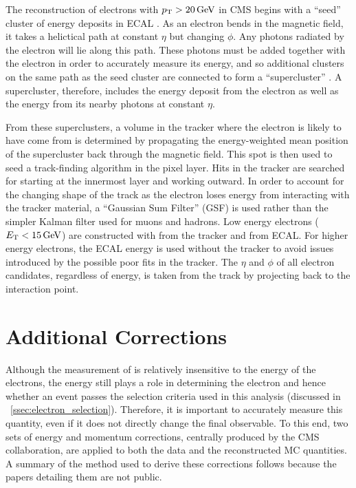 The reconstruction of electrons with $p_{\mathrm{T}} > 20 \,\text{Ge\hspace{-.08em}V}$ in CMS begins with a
``seed'' cluster of energy deposits in ECAL \cite{eg_reco_2010}. As an electron
bends in the magnetic field, it takes a helictical path at constant $\eta$ but
changing $\phi$. Any photons radiated by the electron will lie along this path.
These photons must be added together with the electron in order to accurately
measure its energy, and so additional clusters on the same path as the seed
cluster are connected to form a ``supercluster'' \cite{baffioni_2007}. A
supercluster, therefore, includes the energy deposit from the electron as well
as the energy from its nearby photons at constant $\eta$.

From these superclusters, a volume in the tracker where the electron is likely
to have come from is determined by propagating the energy-weighted mean
position of the supercluster back through the magnetic field. This spot is then
used to seed a track-finding algorithm in the pixel layer. Hits in the tracker
are searched for starting at the innermost layer and working outward. In order
to account for the changing shape of the track as the electron loses energy
from interacting with the tracker material, a ``Gaussian Sum Filter'' (GSF)
\cite{adam_2005} is used rather than the simpler Kalman filter used for muons
and hadrons. Low energy electrons ($E_{\mathrm{T}} < 15 \,\text{Ge\hspace{-.08em}V}$) are constructed with \pt
from the tracker and \ET from ECAL. For higher energy electrons, the ECAL
energy is used without the tracker \pt to avoid issues introduced by the
possible poor fits in the tracker. The $\eta$ and $\phi$ of all electron
candidates, regardless of energy, is taken from the track by projecting back to
the interaction point.

\section{Additional Corrections}
\label{sec:corrections}

Although the measurement of \phistar is relatively insensitive to the energy of
the electrons, the energy still plays a role in determining the electron \pt
and hence whether an event passes the selection criteria used in this analysis
(discussed in \SEC~\ref{ssec:electron_selection}). Therefore, it is important
to accurately measure this quantity, even if it does not directly change the
final observable. To this end, two sets of energy and momentum corrections,
centrally produced by the CMS collaboration, are applied to both the
data and the reconstructed MC quantities. A summary of the method used to
derive these corrections follows because the papers detailing them are not
public.

